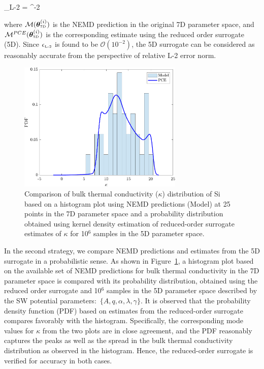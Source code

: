 \be
\epsilon_{\mbox{\tiny{L-2}}} = 
 ^{-2}
\ee
 
\noindent where $\mathcal{M}(\bm{\theta}_{\mbox{\tiny{7D}}}^{(i)})$ is the NEMD prediction in the original 7D
parameter space, and $\mathcal{M}^{PCE}(\bm{\theta}_{\mbox{\tiny{5D}}}^{(i)})$ is the corresponding 
estimate using the reduced order surrogate (5D). 
Since $\epsilon_{\mbox{\tiny{L-2}}}$ is found to be $\mathcal{O}(10^{-2})$, the 5D surrogate can be considered as
reasonably accurate from the perspective of relative L-2 error norm. 

\begin{figure}[htbp]
 \begin{center}
  \includegraphics[width=0.70\textwidth]{./Figures/PCE5D_kde}
\caption{Comparison of bulk thermal conductivity ($\kappa$) distribution of Si based on a histogram plot
using NEMD predictions (Model) at 25 points in the 7D parameter space and a probability distribution obtained 
using kernel density estimation of  reduced-order surrogate estimates of $\kappa$ for 10$^6$ samples in the 5D
parameter space.}
\label{fig:verify}
\end{center}
\end{figure}

In the second strategy, we compare NEMD
predictions and estimates from the 5D surrogate in a probabilistic sense. As shown in Figure~\ref{fig:verify}, a 
histogram plot based on the available set of NEMD predictions for bulk thermal conductivity in the 7D parameter 
space is compared with its probability distribution, obtained using the reduced order surrogate and
10$^6$ samples in the 5D parameter space described by the SW potential parameters:~$\{A,q,\alpha,\lambda,\gamma\}$. It is observed that the probability density function (PDF) based on estimates from the reduced-order surrogate compares
favorably with the histogram. Specifically, the corresponding mode values for $\kappa$ from the two plots are
in close agreement, and the PDF reasonably captures the peaks as well as the spread in
the bulk thermal conductivity distribution as observed in the histogram. 
Hence, the reduced-order surrogate is verified for accuracy in both cases. 
\bigskip

